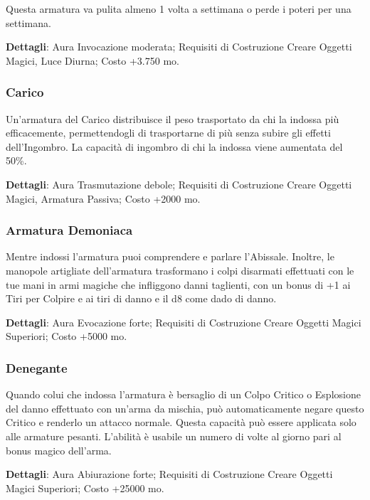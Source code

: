 \begin{multicols}{2}
Questa armatura va pulita almeno 1 volta a settimana o perde i poteri per una settimana.

\textbf{Dettagli}: Aura Invocazione moderata; Requisiti di Costruzione Creare Oggetti Magici, Luce Diurna; Costo +3.750 mo.

\subsubsection*{Carico}

Un'armatura del Carico distribuisce il peso trasportato da chi la indossa più efficacemente, permettendogli di trasportarne di più senza subire gli effetti dell'Ingombro. La capacità di ingombro di chi la indossa viene aumentata del 50\%.

\textbf{Dettagli}: Aura Trasmutazione debole; Requisiti di Costruzione Creare Oggetti Magici, Armatura Passiva; Costo +2000 mo.

\subsubsection*{Armatura Demoniaca}

Mentre indossi l'armatura puoi comprendere e parlare l'Abissale. Inoltre, le manopole artigliate dell'armatura trasformano i colpi disarmati effettuati con le tue mani in armi magiche che infliggono danni taglienti, con un bonus di +1 ai Tiri per Colpire e ai tiri di danno e il d8 come dado di danno.

\textbf{Dettagli}: Aura Evocazione forte; Requisiti di Costruzione Creare Oggetti Magici Superiori; Costo +5000 mo.

\subsubsection*{Denegante}

Quando colui che indossa l'armatura è bersaglio di un Colpo Critico o Esplosione del danno effettuato con un'arma da mischia, può automaticamente negare questo Critico e renderlo un attacco normale. Questa capacità può essere applicata solo alle armature pesanti. L'abilità è usabile un numero di volte al giorno pari al bonus magico dell'arma.

\textbf{Dettagli}: Aura Abiurazione forte; Requisiti di Costruzione Creare Oggetti Magici Superiori; Costo +25000 mo.


\end{multicols}
